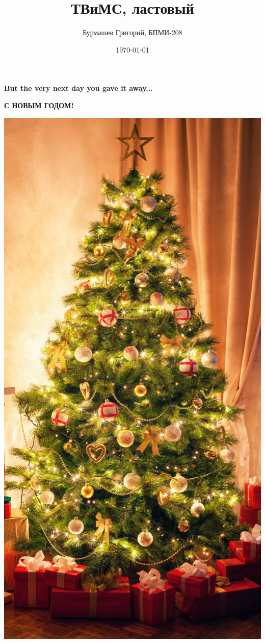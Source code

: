\documentclass[a4paper,12pt]{article}
\author{Бурмашев Григорий, БПМИ-208}
\title{ТВиМС, ластовый}
\date{\today}
\begin{document}
\maketitle 
\begin{center}
\textbf{But the very next day you gave it away...}
\end{center}
\clearpage
\begin{center}
\textbf{С НОВЫМ ГОДОМ!}
\end{center}
\begin{center}
\includegraphics[scale=0.3]{5.jpg}
\end{center}
\clearpage
\end{document}
